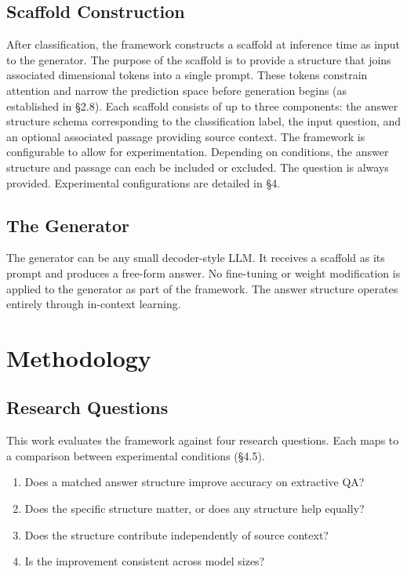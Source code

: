 \documentclass{article}
\begin{document}
\subsection{Scaffold Construction}

After classification, the framework constructs a scaffold at inference time as input to the generator. The purpose of the scaffold is to provide a structure that joins associated dimensional tokens into a single prompt. These tokens constrain attention and narrow the prediction space before generation begins (as established in \S2.8). Each scaffold consists of up to three components: the answer structure schema corresponding to the classification label, the input question, and an optional associated passage providing source context. The framework is configurable to allow for experimentation. Depending on conditions, the answer structure and passage can each be included or excluded. The question is always provided. Experimental configurations are detailed in \S4.

\subsection{The Generator}

The generator can be any small decoder-style LLM. It receives a scaffold as its prompt and produces a free-form answer. No fine-tuning or weight modification is applied to the generator as part of the framework. The answer structure operates entirely through in-context learning.

\section{Methodology}

\subsection{Research Questions}

This work evaluates the framework against four research questions. Each maps to a comparison between experimental conditions (\S4.5).

\begin{enumerate}
  \item Does a matched answer structure improve accuracy on extractive QA?
  \item Does the specific structure matter, or does any structure help equally?
  \item Does the structure contribute independently of source context?
  \item Is the improvement consistent across model sizes?
\end{enumerate}
\end{document}
